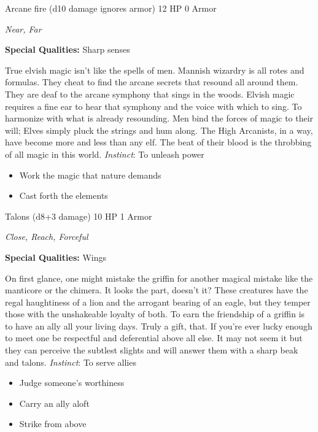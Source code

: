 Arcane fire (d10 damage ignores armor)\hspace*{\fill} 12 HP 0 Armor

\emph{Near, Far}

\textbf{Special Qualities:}
Sharp senses

\HRule
True elvish magic isn't like the spells of men. Mannish wizardry is all rotes and formulas. They cheat to find the arcane secrets that resound all around them. They are deaf to the arcane symphony that sings in the woods. Elvish magic requires a fine ear to hear that symphony and the voice with which to sing. To harmonize with what is already resounding. Men bind the forces of magic to their will; Elves simply pluck the strings and hum along. The High Arcanists, in a way, have become more and less than any elf. The beat of their blood is the throbbing of all magic in this world. \emph{Instinct}: To unleash power
\begin{itemize}
\item Work the magic that nature demands
\item Cast forth the elements
\end{itemize}

\HRule
{}

Talons (d8+3 damage)\hspace*{\fill} 10 HP 1 Armor

\emph{Close, Reach, Forceful}

\textbf{Special Qualities:}
Wings

\HRule
On first glance, one might mistake the griffin for another magical mistake like the manticore or the chimera. It looks the part, doesn't it? These creatures have the regal haughtiness of a lion and the arrogant bearing of an eagle, but they temper those with the unshakeable loyalty of both. To earn the friendship of a griffin is to have an ally all your living days. Truly a gift, that. If you're ever lucky enough to meet one be respectful and deferential above all else. It may not seem it but they can perceive the subtlest slights and will answer them with a sharp beak and talons. \emph{Instinct}: To serve allies
\begin{itemize}
\item Judge someone's worthiness
\item Carry an ally aloft
\item Strike from above
\end{itemize}

